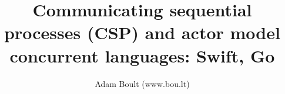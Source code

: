 \documentclass[oneside]{book}
\begin{document}
\author{Adam Boult (www.bou.lt)}
\title{Communicating sequential processes (CSP) and actor model concurrent languages: Swift, Go}
\maketitle

\setcounter{tocdepth}{0}
\tableofcontents


\end{document}

